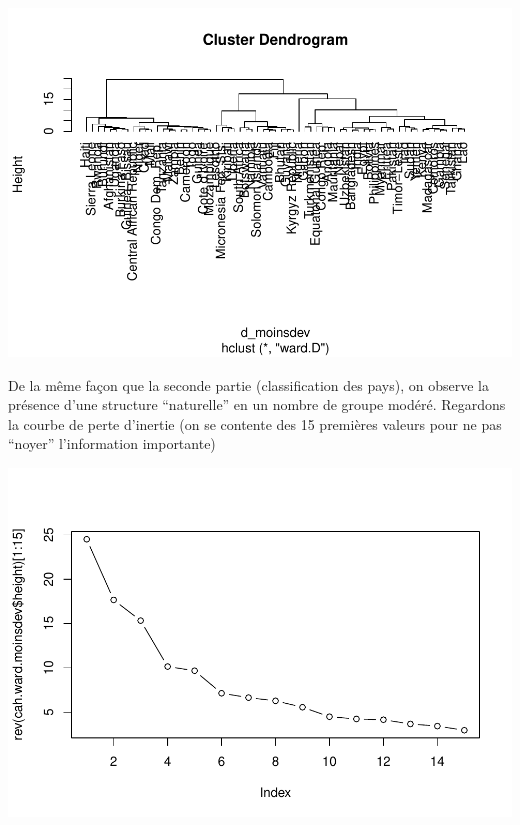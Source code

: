 \documentclass[
]{article}
\newenvironment{Shaded}{}{}
\newcommand{\AttributeTok}[1]{#1}
\newcommand{\DecValTok}[1]{#1}
\newcommand{\FunctionTok}[1]{#1}
\newcommand{\NormalTok}[1]{#1}
\newcommand{\SpecialCharTok}[1]{\textcolor[rgb]{0.00,0.50,0.50}{#1}}
\newcommand{\StringTok}[1]{\textcolor[rgb]{0.00,0.50,0.50}{#1}}
\begin{document}
\includegraphics{Projet_files/figure-latex/unnamed-chunk-28-1.pdf}

De la même façon que la seconde partie (classification des pays), on
observe la présence d'une structure ``naturelle'' en un nombre de groupe
modéré. Regardons la courbe de perte d'inertie (on se contente des 15
premières valeurs pour ne pas ``noyer'' l'information importante)

\begin{Shaded}
\end{Shaded}

\includegraphics{Projet_files/figure-latex/unnamed-chunk-29-1.pdf}
\end{document}
